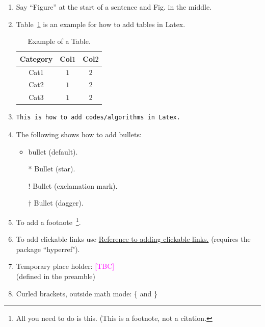 \documentclass[pre,aps,reprint,noshowpacs,superscriptaddress,floatfix,letterpaper,longbibliography]{revtex4-2}
\newcommand{\TBC}{\magenta{[TBC]}}
\newcommand{\magenta}{\textcolor{magenta}}
\begin{document}
\begin{enumerate}
\item Say ``Figure'' at the start of a sentence and Fig. in the middle.  

\item Table~\ref{Table1} is an example for how to add tables in Latex. 
\begin{table}[h!] 
\footnotesize
\begin{tabular}{| c | c | c |} %
\hline\hline 
Category & Col$1$ & Col$2$\\
[0.5ex] %
\hline 
Cat1&$1$&$2$\\
Cat2&$1$&$2$\\
Cat3&$1$&$2$\\
[0.5ex]
\hline\hline 
\end{tabular} 
\caption{\footnotesize{Example of a Table.}}
\label{Table1} 
\end{table} 


\item \begin{verbatim}
This is how to add codes/algorithms in Latex.
\end{verbatim} 

\item The following shows how to add bullets: 
\begin{itemize}
  \item bullet (default). 
  \item[*] Bullet (star). 
  \item[!] Bullet (exclamation mark).  
  \item[$\dagger$] Bullet (dagger). 
  \label{ListBullets}
\end{itemize}

\item To add a footnote~\footnote{All you need to do is this. (This is a footnote, not a citation.}. 

\item To add clickable links use 
\href{https://latex-tutorial.com/tutorials/hyperlinks/}{Reference to adding clickable links.} (requires the package ``hyperref"). 

\item Temporary place holder: \TBC \\ (defined in the preamble)

\item Curled brackets, outside math mode: \{ and \}


\label{List:Latex}
\end{enumerate}
\end{document}
